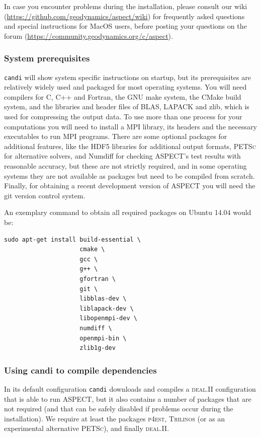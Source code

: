 \documentclass{article}
\newcommand{\dealii}{{\textsc{deal.II}}}
\newcommand{\pfrst}{{\normalfont\textsc{p4est}}}
\newcommand{\trilinos}{{\textsc{Trilinos}}}
\newcommand{\petsc}{{\textsc{PETSc}}}
\newcommand{\aspect}{\textsc{ASPECT}}
\begin{document}
In case you encounter problems during the installation, please consult our wiki
(\url{https://github.com/geodynamics/aspect/wiki}) for frequently asked
questions and special instructions for MacOS users, before posting your
questions on the forum (\url{https://community.geodynamics.org/c/aspect}).

\subsubsection{System prerequisites}

\texttt{candi} will show system specific instructions on startup, but its prerequisites
are relatively widely used and packaged
for most operating systems. You will need compilers for C, C++ and
Fortran, the GNU make system, the CMake build system, and the libraries and
header files of BLAS, LAPACK and zlib, which is used for compressing
the output data. To use more than one process for your computations
you will need to install a MPI library, its headers and the
necessary executables to run MPI programs. There are some optional packages
for additional features, like the HDF5 libraries for additional output formats,
\petsc{} for alternative solvers, and Numdiff for checking \aspect{}'s test
results with reasonable accuracy, but these are not strictly required, and in
some operating systems they are not available as packages but need to be
compiled from scratch.
Finally, for obtaining a recent development version of \aspect{} you will
need the git version control system.

An exemplary command to obtain all required packages on Ubuntu 14.04 would be:
\begin{verbatim}
sudo apt-get install build-essential \
                     cmake \
                     gcc \
                     g++ \
                     gfortran \
                     git \
                     libblas-dev \
                     liblapack-dev \
                     libopenmpi-dev \
                     numdiff \
                     openmpi-bin \
                     zlib1g-dev
\end{verbatim}

\subsubsection{Using candi to compile dependencies}

In its default configuration \texttt{candi} downloads and
compiles a \dealii{} configuration that is able to run \aspect, but it
also contains a number of packages that are not required (and that can
be safely disabled if problems occur during the
installation). We require at least the packages \pfrst{}, \trilinos{} 
(or as an experimental alternative \petsc{}), and finally \dealii{}.
 
\end{document}
